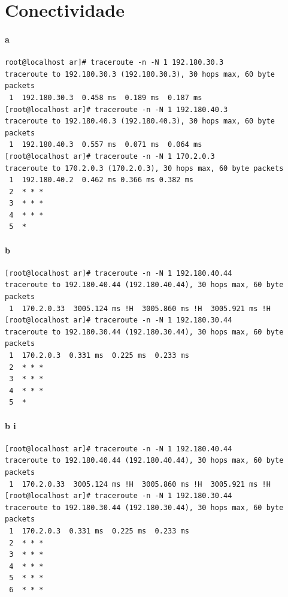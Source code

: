 \section{Conectividade}
\paragraph{a}
\begin{verbatim}
root@localhost ar]# traceroute -n -N 1 192.180.30.3
traceroute to 192.180.30.3 (192.180.30.3), 30 hops max, 60 byte packets
 1  192.180.30.3  0.458 ms  0.189 ms  0.187 ms
[root@localhost ar]# traceroute -n -N 1 192.180.40.3
traceroute to 192.180.40.3 (192.180.40.3), 30 hops max, 60 byte packets
 1  192.180.40.3  0.557 ms  0.071 ms  0.064 ms
[root@localhost ar]# traceroute -n -N 1 170.2.0.3
traceroute to 170.2.0.3 (170.2.0.3), 30 hops max, 60 byte packets
 1  192.180.40.2  0.462 ms 0.366 ms 0.382 ms
 2  * * *
 3  * * *
 4  * * *
 5  *
\end{verbatim}

\paragraph{b}
\begin{verbatim}
[root@localhost ar]# traceroute -n -N 1 192.180.40.44                    
traceroute to 192.180.40.44 (192.180.40.44), 30 hops max, 60 byte packets
 1  170.2.0.33  3005.124 ms !H  3005.860 ms !H  3005.921 ms !H           
[root@localhost ar]# traceroute -n -N 1 192.180.30.44                    
traceroute to 192.180.30.44 (192.180.30.44), 30 hops max, 60 byte packets
 1  170.2.0.3  0.331 ms  0.225 ms  0.233 ms                              
 2  * * *                                                                
 3  * * *                                                                
 4  * * *                                                                
 5  *                                                                    
\end{verbatim}

\paragraph{b i}
\begin{verbatim}
[root@localhost ar]# traceroute -n -N 1 192.180.40.44                     
traceroute to 192.180.40.44 (192.180.40.44), 30 hops max, 60 byte packets 
 1  170.2.0.33  3005.124 ms !H  3005.860 ms !H  3005.921 ms !H            
[root@localhost ar]# traceroute -n -N 1 192.180.30.44                     
traceroute to 192.180.30.44 (192.180.30.44), 30 hops max, 60 byte packets 
 1  170.2.0.3  0.331 ms  0.225 ms  0.233 ms                               
 2  * * *                                                                 
 3  * * *                                                                 
 4  * * *                                                                 
 5  * * *                                                                 
 6  * * *                                                                 
\end{verbatim}
